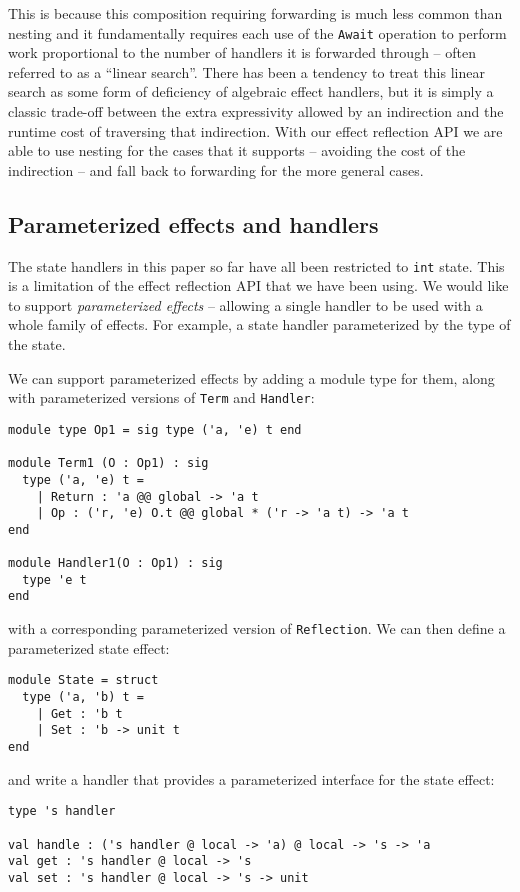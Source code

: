 \documentclass[acmsmall, screen, nonacm]{acmart}
\theoremstyle{definition}
\begin{document}
This is because this composition requiring forwarding is much less
common than nesting and it fundamentally requires each use of the
\lstinline[style=oxcaml]{Await} operation to perform work proportional to
the number of handlers it is forwarded through -- often referred to as a
``linear search''. There has been a tendency to treat this linear search
as some form of deficiency of algebraic effect handlers, but it is
simply a classic trade-off between the extra expressivity allowed by an
indirection and the runtime cost of traversing that indirection. With
our effect reflection API we are able to use nesting for the cases that
it supports -- avoiding the cost of the indirection -- and fall back to
forwarding for the more general cases.

\subsection{Parameterized effects and handlers}

The state handlers in this paper so far have all been restricted to
\lstinline[style=oxcaml]{int} state. This is a limitation of the effect
reflection API that we have been using. We would like to support
\emph{parameterized effects} -- allowing a single handler to be used
with a whole family of effects. For example, a state handler
parameterized by the type of the state.

We can support parameterized effects by adding a module type for them,
along with parameterized versions of \lstinline[style=oxcaml]{Term} and
\lstinline[style=oxcaml]{Handler}:
\begin{lstlisting}[style=oxcaml]
module type Op1 = sig type ('a, 'e) t end

module Term1 (O : Op1) : sig
  type ('a, 'e) t =
    | Return : 'a @@ global -> 'a t
    | Op : ('r, 'e) O.t @@ global * ('r -> 'a t) -> 'a t
end

module Handler1(O : Op1) : sig
  type 'e t
end
\end{lstlisting}
with a corresponding parameterized version of
\lstinline[style=oxcaml]{Reflection}. We can then define a parameterized
state effect:
\begin{lstlisting}[style=oxcaml]
module State = struct
  type ('a, 'b) t =
    | Get : 'b t
    | Set : 'b -> unit t
end
\end{lstlisting}
and write a handler that provides a parameterized interface for the
state effect:
\begin{lstlisting}[style=oxcaml]
type 's handler

val handle : ('s handler @ local -> 'a) @ local -> 's -> 'a
val get : 's handler @ local -> 's
val set : 's handler @ local -> 's -> unit
\end{lstlisting}
\end{document}
